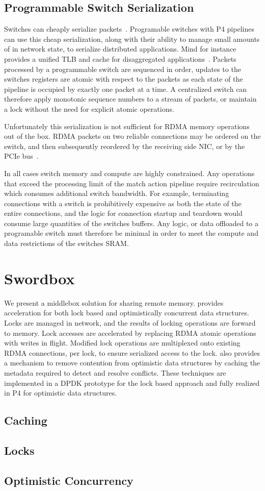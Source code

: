 \subsection{Programmable Switch Serialization}

Switches can cheaply serialize packets~\cite{when-computer}.
Programable switches with P4 pipelines can use this cheap
serialization, along with their ability to manage small
amounts of in network state, to serialize distributed
applications. Mind for instance provides a unified TLB and
cache for disaggregated applications~\cite{mind}. Packets
processed by a programmable switch are sequenced in order,
updates to the switches registers are atomic with respect to
the packets as each state of the pipeline is occupied by
exactly one packet at a time. A centralized switch can
therefore apply monotonic sequence numbers to a stream of
packets, or maintain a lock without the need for explicit
atomic operations.

Unfortunately this serialization is not sufficient for RDMA
memory operations out of the box. RDMA packets on two
reliable connections may be ordered on the switch, and then
subsequently reordered by the receiving side NIC, or by the
PCIe bus~\cite{understanding-pcie}.

In all cases switch memory and compute are highly
constrained. Any operations that exceed the processing
limit of the match action pipeline require recirculation
which consumes additional switch bandwidth. For example,
terminating connections with a switch is prohibitively
expensive as both the state of the entire connections, and
the logic for connection startup and teardown would consume
large quantities of the switches buffers. Any logic, or data
offloaded to a programable switch must therefore be minimal
in order to meet the compute and data restrictions of the
switches SRAM.

\section{Swordbox}

We present \sword a middlebox solution for sharing remote
memory. \sword provides acceleration for both lock based and
optimistically concurrent data structures. Locks are managed
in network, and the results of locking operations are
forward to memory. Lock accesses are accelerated by
replacing RDMA atomic operations with writes in flight.
Modified lock operations are multiplexed onto existing RDMA
connections, per lock, to ensure serialized access to the
lock. \sword also provides a mechanism to remove contention
from optimistic data structures by caching the metadata
required to detect and resolve conflicts. These techniques
are implemented in a DPDK prototype for the lock based
approach and fully realized in P4 for optimistic data
structures.

\subsection{Caching}

\subsection{Locks}

\subsection{Optimistic Concurrency}